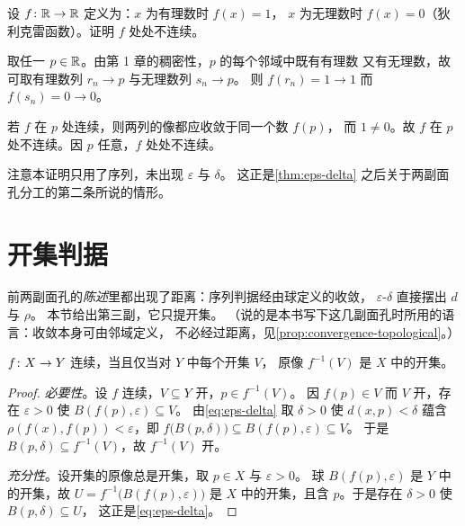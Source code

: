 \begin{example}[判定不连续]
  \label{ex:discontinuous}
  设 \(f \colon \mathbb{R} \to \mathbb{R}\) 定义为：\(x\) 为有理数时 \(f(x)=1\)，
  \(x\) 为无理数时 \(f(x)=0\)（狄利克雷函数）。证明 \(f\) 处处不连续。
  \begin{worked}
    取任一 \(p \in \mathbb{R}\)。由第 1 章的稠密性，\(p\) 的每个邻域中既有有理数
    又有无理数，故可取有理数列 \(r_{n} \to p\) 与无理数列 \(s_{n} \to p\)。
    则 \(f(r_{n}) = 1 \to 1\) 而 \(f(s_{n}) = 0 \to 0\)。

    若 \(f\) 在 \(p\) 处连续，则两列的像都应收敛于同一个数 \(f(p)\)，
    而 \(1 \neq 0\)。故 \(f\) 在 \(p\) 处不连续。因 \(p\) 任意，\(f\) 处处不连续。

    注意本证明只用了序列，未出现 \(\varepsilon\) 与 \(\delta\)。
    这正是\cref{thm:eps-delta} 之后关于两副面孔分工的第二条所说的情形。
  \end{worked}
\end{example}

\section{开集判据}
\label{sec:open-continuity}

前两副面孔的\emph{陈述}里都出现了距离：序列判据经由球定义的收敛，
\(\varepsilon\)-\(\delta\) 直接摆出 \(d\) 与 \(\rho\)。
本节给出第三副，它只提开集。
（说的是本书写下这几副面孔时所用的语言：收敛本身可由邻域定义，
不必经过距离，见\cref{prop:convergence-topological}。）

\begin{theorem}[开集判据]
  \label{thm:open-preimage}
  \(f \colon X \to Y\) 连续，当且仅当对 \(Y\) 中每个开集 \(V\)，
  原像 \(f^{-1}(V)\) 是 \(X\) 中的开集。
\end{theorem}

\begin{proof}
  \emph{必要性}。设 \(f\) 连续，\(V \subseteq Y\) 开，\(p \in f^{-1}(V)\)。
  因 \(f(p) \in V\) 而 \(V\) 开，存在 \(\varepsilon>0\) 使 \(B(f(p),\varepsilon) \subseteq V\)。
  由\cref{eq:eps-delta} 取 \(\delta>0\) 使 \(d(x,p)<\delta\) 蕴含
  \(\rho(f(x),f(p))<\varepsilon\)，即 \(f\bigl(B(p,\delta)\bigr) \subseteq B(f(p),\varepsilon) \subseteq V\)。
  于是 \(B(p,\delta) \subseteq f^{-1}(V)\)，故 \(f^{-1}(V)\) 开。

  \emph{充分性}。设开集的原像总是开集，取 \(p \in X\) 与 \(\varepsilon>0\)。
  球 \(B(f(p),\varepsilon)\) 是 \(Y\) 中的开集，故 \(U = f^{-1}\bigl(B(f(p),\varepsilon)\bigr)\)
  是 \(X\) 中的开集，且含 \(p\)。于是存在 \(\delta>0\) 使 \(B(p,\delta) \subseteq U\)，
  这正是\cref{eq:eps-delta}。
\end{proof}

